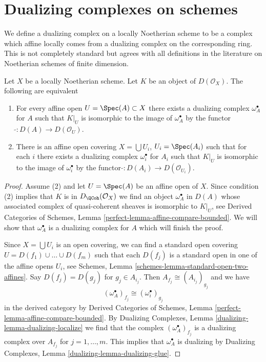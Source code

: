 \section{Dualizing complexes on schemes}
\label{section-dualizing-schemes}

\noindent
We define a dualizing complex on a locally Noetherian scheme
to be a complex which affine locally comes from a dualizing
complex on the corresponding ring. This is not completely
standard but agrees with all definitions in the literature
on Noetherian schemes of finite dimension.

\begin{lemma}
\label{lemma-equivalent-definitions}
Let $X$ be a locally Noetherian scheme. Let $K$ be an object of
$D(\mathcal{O}_X)$. The following are equivalent
\begin{enumerate}
\item For every affine open $U = \Spec(A) \subset X$ there exists
a dualizing complex $\omega_A^\bullet$ for $A$ such that
$K|_U$ is isomorphic to the image of $\omega_A^\bullet$ by
the functor $\widetilde{} : D(A) \to D(\mathcal{O}_U)$.
\item There is an affine open covering $X = \bigcup U_i$, $U_i = \Spec(A_i)$
such that for each $i$ there exists a dualizing complex $\omega_i^\bullet$
for $A_i$ such that $K|_U$ is isomorphic to the image of $\omega_i^\bullet$ by
the functor $\widetilde{} : D(A_i) \to D(\mathcal{O}_{U_i})$.
\end{enumerate}
\end{lemma}

\begin{proof}
Assume (2) and let $U = \Spec(A)$ be an affine open of $X$.
Since condition (2) implies that $K$ is in $D_\QCoh(\mathcal{O}_X)$
we find an object $\omega_A^\bullet$ in $D(A)$ whose associated
complex of quasi-coherent sheaves is isomorphic to $K|_U$, see
Derived Categories of Schemes, Lemma
\ref{perfect-lemma-affine-compare-bounded}.
We will show that $\omega_A^\bullet$ is a dualizing complex for $A$
which will finish the proof.

\medskip\noindent
Since $X = \bigcup U_i$ is an open covering, we can find a standard
open covering $U = D(f_1) \cup \ldots \cup D(f_m)$ such that
each $D(f_j)$ is a standard open in one of the affine opens $U_i$, see
Schemes, Lemma \ref{schemes-lemma-standard-open-two-affines}.
Say $D(f_j) = D(g_j)$ for $g_j \in A_{i_j}$.
Then $A_{f_j} \cong (A_{i_j})_{g_j}$ and we have
$$
(\omega_A^\bullet)_{f_j} \cong (\omega_i^\bullet)_{g_j}
$$
in the derived category by
Derived Categories of Schemes, Lemma
\ref{perfect-lemma-affine-compare-bounded}.
By Dualizing Complexes, Lemma \ref{dualizing-lemma-dualizing-localize}
we find that
the complex $(\omega_A^\bullet)_{f_j}$ is a dualizing complex over
$A_{f_j}$ for $j = 1, \ldots, m$. This implies that $\omega_A^\bullet$
is dualizing by
Dualizing Complexes, Lemma \ref{dualizing-lemma-dualizing-glue}.
\end{proof}

